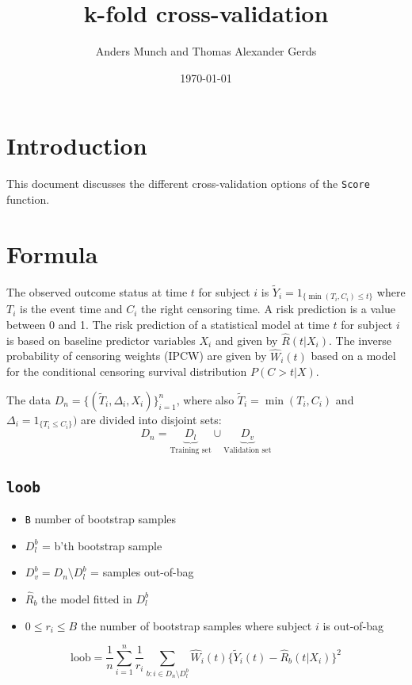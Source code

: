 \documentclass{article}
\author{Anders Munch and Thomas Alexander Gerds}
\affil{University of Copenhagen, Department of Public Health, Section of Biostatistics, Copenhagen, Denmark}
\date{\today}
\title{k-fold cross-validation}
\begin{document}
\maketitle

\section{Introduction}
\label{sec:orgc3bac13}

This document discusses the different cross-validation options of the
\texttt{Score} function.

\section{Formula}
\label{sec:org2a05972}

The observed outcome status at time \(t\) for subject \(i\) is
\(\tilde Y_i=1_{\{\min(T_i,C_i)\le t\}}\) where \(T_i\) is the event
time and \(C_i\) the right censoring time. A risk prediction is a
value between 0 and 1. The risk prediction of a statistical model at
time \(t\) for subject \(i\) is based on baseline predictor variables
\(X_i\) and given by \(\hat R(t|X_i)\). The inverse probability of
censoring weights (IPCW) are given by \(\hat W_i(t)\) based on a model for
the conditional censoring survival distribution \(P(C> t|X)\).

The data \(D_n=\{(\tilde T_i,\Delta_i,X_i)\}_{i=1}^n\), where also
\(\tilde T_i=\min (T_i,C_i)\) and \(\Delta_i=1_{\{T_i\le C_i\}})\) are
divided into disjoint sets:
\begin{equation*}
D_n = \underbrace{D_l}_{\text{Training set}} \cup \underbrace{D_v}_{\text{Validation set}}
\end{equation*}

\subsection{\texttt{loob}}
\label{sec:org86449da}

\begin{itemize}
\item \texttt{B} number of bootstrap samples
\item \(D_l^b\) = b'th bootstrap sample
\item \(D_v^b=D_n \setminus D_l^b\)  = samples out-of-bag
\item \(\hat R_b\) the model fitted in \(D_l^b\)
\item \(0\le r_i \le B\) the number of bootstrap samples where subject \(i\) is out-of-bag
\end{itemize}
\begin{equation*}
\text{loob}=\frac 1 n \sum_{i=1}^n\frac{1}{r_i}
\sum_{b: i\in D_n\setminus D^b_l}\hat W_i(t) \{\tilde Y_i(t)-\hat
R_b(t|X_i)\}^2
\end{equation*}
\end{document}
